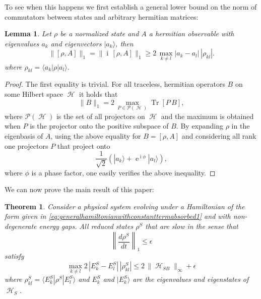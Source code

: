 \documentclass[aps,prl,twocolumn,showpacs,showkeys,a4paper]{revtex4}
\newtheorem{lemma}{Lemma}
\newtheorem{theorem}{Theorem}
\DeclareMathOperator{\Tr}{\mathrm{Tr}}%
\DeclareMathOperator{\ee}{\mathrm{e}}%
\DeclareMathOperator{\iu}{\mathrm{i}}%
\DeclareMathOperator{\hiH}{\mathcal{H}}%
\DeclareMathOperator{\haH}{\mathscr{H}}%
\newcommand{\bra}[1]{\langle #1|}
\newcommand{\ket}[1]{|#1\rangle}
\begin{document}
To see when this happens we first establish a general lower bound on the norm of commutators between states and arbitrary hermitian matrices:
\begin{lemma}
  \label{lemma:lowerboundonnormsofcommuators}
  Let $\rho$ be a normalized state and $A$ a hermitian observable with eigenvalues $a_k$ and eigenvectors $\ket{a_k}$, then
  \begin{equation}
    \| [\rho,A] \|_1 = \| \iu\,[\rho,A] \|_1 \geq 2\,\max_{k \neq l} |a_k - a_l|\,|\rho_{kl}|.
  \end{equation}
  where $\rho_{kl} = \bra{a_k}\rho\ket{a_l}$.
\end{lemma}
\begin{proof}
  The first equality is trivial.
  For all traceless, hermitian operators $B$ on some Hilbert space $\hiH$ it holds that \cite{nielsenm.a.c}
  \begin{equation}
    \|B\|_1 = 2\,\max_{P \in \mathcal{P}(\hiH)} \Tr[P\,B] ,
  \end{equation}
  where $\mathcal{P}(\hiH)$ is the set of all projectors on $\hiH$ and the maximum is obtained when $P$ is the projector onto the positive subspace of $B$.
  By expanding $\rho$ in the eigenbasis of $A$, using the above equality for $B=[\rho,A]$ and considering all rank one projectors $P$ that project onto
  \begin{equation}
    \frac{1}{\sqrt{2}}(\ket{a_k} + \ee^{\iu \phi} \ket{a_l}) ,
  \end{equation}
  where $\phi$ is a phase factor, one easily verifies the above inequality.
\end{proof}
We can now prove the main result of this paper:
\begin{theorem}
  \label{theorem:slowstatesmustdecohere}
  Consider a physical system evolving under a Hamiltonian of the form given in \eqref{eq:generalhamiltonianwithconstanttermabsorbed1} and with non-degenerate energy gaps.
  All reduced states $\rho^S$ that are slow in the sense that
  \begin{equation}
    \left\|\frac{d\rho^S}{dt}\right\|_1 \leq \epsilon
  \end{equation}
  satisfy
  \begin{equation}
    \max_{k \neq l} 2\,|E^S_k - E^S_l|\,|\rho^S_{kl}| \leq 2\,\|\haH_{SB}\|_{\infty} + \epsilon
  \end{equation}
  where $\rho^S_{kl} = \bra{E^S_k} \rho^S \ket{E^S_l}$ and $E^S_k$ and $\ket{E^S_k}$ are the eigenvalues and eigenstates of $\haH_S$.
\end{theorem}
\end{document}
